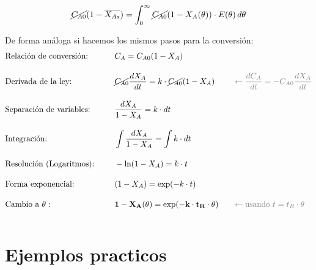 \begin{equation}
    \cancel{C_{A0}}(1-\overline{X_{As}}) = \int_{0}^{\infty} \cancel{C_{A0}} (1-X_A(\theta)) \cdot E(\theta) \, d\theta
\end{equation}

\noindent De forma análoga si hacemos los mismos pasos para la conversión:
\begin{alignat}{3}
     & \text{Relación de conversión:}              &  & C_A = C_{A0}(1 - X_A)                                              & \quad & \nonumber                                                                                             \\[10pt]
     & \text{Derivada de la ley:}                  &  & \cancel{C_{A0}} \frac{dX_A}{dt} = k \cdot \cancel{C_{A0}}(1 - X_A) & \quad & \textcolor{gray}{\leftarrow \frac{dC_A}{dt} = -C_{A0} \frac{dX_A}{dt}} \nonumber                      \\[10pt]
     & \text{Separación de variables:\hspace{2em}} &  & \frac{dX_A}{1 - X_A} = k \cdot dt                                  & \quad & \nonumber                                                                                             \\[10pt]
     & \text{Integración:}                         &  & \int \frac{dX_A}{1 - X_A} = \int k \cdot dt                        & \quad & \nonumber                                                                                             \\[10pt]
     & \text{Resolución (Logaritmos):}             &  & -\ln(1 - X_A) = k \cdot t                                          & \quad & \nonumber                                                                                             \\[10pt]
     & \text{Forma exponencial:}                   &  & (1 - X_A) = \exp(-k \cdot t)                                       & \quad & \nonumber                                                                                             \\[10pt]
     & \text{Cambio a } \theta:                    &  & \mathbf{1 - X_A(\theta) = \exp(-k \cdot t_R \cdot \theta)}         & \quad & \textcolor{gray}{\leftarrow \text{usando } t = t_R \cdot \theta}     \label{eq:flujo_segregado_final} \\[10pt]
\end{alignat}
\section{Ejemplos practicos}
